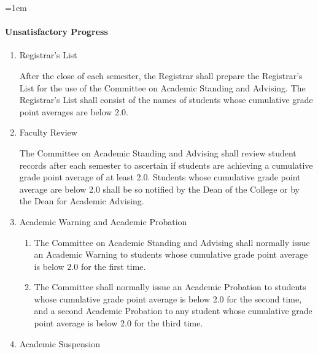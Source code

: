 \documentclass{manual}
\let\oldparagraph\paragraph
\renewcommand\paragraph{\leftskip=1em\oldparagraph}
\newcommand{\itemLevelA}{\alph*.}
\newcommand{\itemLevelB}{\arabic*)}
\newcommand{\itemRefA}{\alph*}
\newcommand{\itemRefB}{\arabic*}
\begin{document}
			\paragraph{Unsatisfactory Progress}\label{par:UnsatisfactoryProgress}

				\begin{enumerate}[label=\itemLevelA,ref=\itemRefA]
				\item Registrar's List 

					After the close of each semester, the Registrar shall prepare the Registrar's List for the use of the        Committee on Academic Standing and Advising. The Registrar's List shall consist of the names of        students whose cumulative grade point averages are below 2.0.
				
				\item Faculty Review         

					The Committee on Academic Standing and Advising shall review student records after each semester to ascertain if students are achieving a cumulative grade point average of at least 2.0. Students whose cumulative grade point average are below 2.0 shall be so notified by the Dean of the College or by the Dean for Academic Advising.
				
				\item Academic Warning and Academic Probation        

					\begin{enumerate}[label=\itemLevelB,ref=\itemRefB]
					\item The Committee on Academic Standing and Advising shall normally issue an Academic Warning to students whose cumulative grade point average is below 2.0 for the first time. 
					\item The Committee shall normally issue an Academic Probation to students whose cumulative grade point average is below 2.0 for the second time, and a second Academic Probation to any student whose cumulative grade point average is below 2.0 for the third time. 
					\end{enumerate}
				
				\item Academic Suspension


\end{enumerate}
\end{document}
